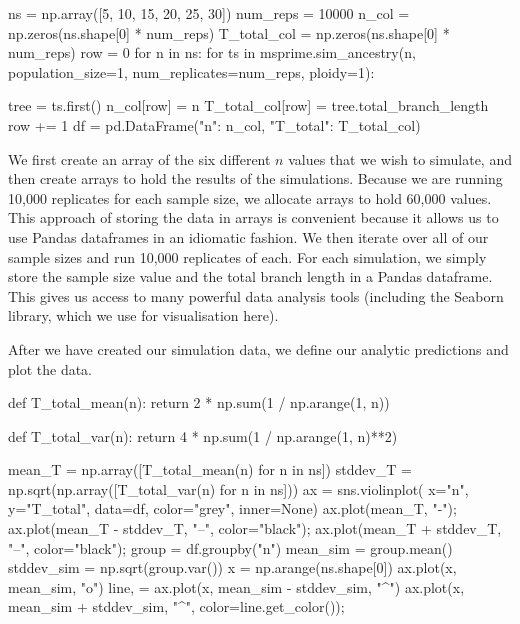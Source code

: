 \documentclass[graybox]{svmult}
\begin{document}
\begin{pythoncode}
ns = np.array([5, 10, 15, 20, 25, 30])
num_reps = 10000
n_col = np.zeros(ns.shape[0] * num_reps)
T_total_col = np.zeros(ns.shape[0] * num_reps)
row = 0
for n in ns:
    for ts in msprime.sim_ancestry(n, population_size=1,
            num_replicates=num_reps, ploidy=1):

        tree = ts.first()
        n_col[row] = n
        T_total_col[row] = tree.total_branch_length
        row += 1
df = pd.DataFrame({"n": n_col, "T_total": T_total_col})
\end{pythoncode}

    We first create an array of the six different \(n\) values that we wish to simulate, and then create arrays to hold the results of the
simulations. Because we are running 10,000 replicates for each sample
size, we allocate arrays to hold 60,000 values. This approach of storing
the data in arrays is convenient because it allows us to use Pandas
dataframes in an idiomatic fashion. We then iterate
over all of our sample sizes and run 10,000 replicates of each. For each
simulation, we simply store the sample size value and the total branch
length in a Pandas dataframe. This gives us access to many powerful data analysis tools (including the Seaborn library, which we use for visualisation here).

After we have created our simulation data, we define our analytic
predictions and plot the data.

\begin{pythoncode}
def T_total_mean(n):
    return 2 * np.sum(1 / np.arange(1, n))

def T_total_var(n):
    return 4 * np.sum(1 / np.arange(1, n)**2)

mean_T = np.array([T_total_mean(n) for n in ns])
stddev_T = np.sqrt(np.array([T_total_var(n) for n in ns]))
ax = sns.violinplot(
    x="n", y="T_total", data=df, color="grey", inner=None)
ax.plot(mean_T, "-");
ax.plot(mean_T - stddev_T, "--", color="black");
ax.plot(mean_T + stddev_T, "--", color="black");
group = df.groupby("n")
mean_sim = group.mean()
stddev_sim = np.sqrt(group.var())
x = np.arange(ns.shape[0])
ax.plot(x, mean_sim, "o")
line, = ax.plot(x, mean_sim - stddev_sim, "^")
ax.plot(x, mean_sim + stddev_sim, "^", color=line.get_color());
\end{pythoncode}
\end{document}
